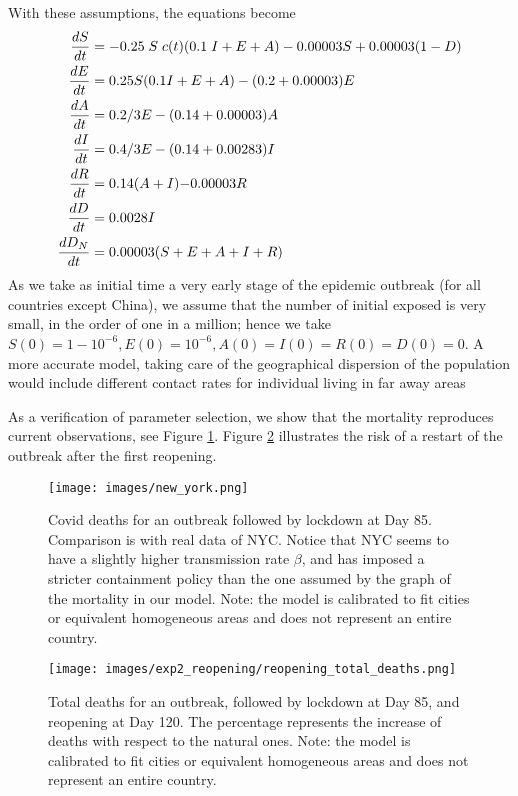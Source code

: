 \documentclass{amsart}
\begin{document}
With these assumptions, the equations become
\begin{align} 
\frac{dS}{dt} & =-0.25 \hskip 1mm S  \hskip 1mm
c(t)(0.1 \hskip 1mm I+E+A)-0.00003 S + 0.00003(1-D)\label{eq:dS1}\\
\frac{dE}{dt} & =0.25 S(0.1 I+E+A)-(0.2+0.00003)E\label{eq:dE1}\\
\frac{dA}{dt} & = 0.2/3 E -(0.14+
0.00003) A \label{eq:dA}\\
\frac{dI}{dt} & =0.4/3 E-(0.14+
0.00283)I\label{eq:dI1}\\
\frac{dR}{dt} & =0.14 (A+I){-0.00003 R}\label{eq:dR1}\\
\frac{dD}{dt} & =0.0028 I\label{eq:dD1}\\
\frac{dD_N}{dt} & = 0.00003(S+E+A+I+R)\label{eq:dDN1}
\end{align}
As we take as initial time a very early stage of the epidemic
outbreak (for all countries except China), we assume that the number of initial exposed is very small, in the order of
one in a million; hence we take $S(0)=1-10^{-6}, E(0)=10^{-6},  A(0)=I(0)=R(0)=D(0)=0$.
A more accurate model, taking care of the geographical dispersion
of the population would include different contact rates
for individual living in far away areas \cite{MarinoGattoetal}

As a verification of parameter selection, we show
that the mortality reproduces current observations,
see Figure \ref{total_deaths1}. 
Figure \ref{total_deaths2} illustrates the risk of a
restart of the outbreak after the first reopening.

\begin{figure}[h!]
    \centering
    \texttt{[image: images/new\_york.png]}
    \caption{ Covid deaths for an outbreak followed by lockdown at Day 85.
    Comparison is
    with real data of NYC. Notice that NYC seems to have 
    a slightly higher transmission rate $\beta$,
    and has imposed a stricter containment policy than
    the one assumed by the graph of the mortality 
    in our model. \footnotesize{Note: the model is calibrated to fit cities or equivalent homogeneous areas and does not represent an entire country.}}
    \label{total_deaths1}
\end{figure}





\begin{figure}[h!]
    \centering
    \texttt{[image: images/exp2\_reopening/reopening\_total\_deaths.png]}
    \caption{Total deaths for an outbreak, followed by lockdown at Day 85, and reopening at Day 120.
    The percentage represents the increase of deaths with respect to the natural ones. \footnotesize{Note: the model is calibrated to fit cities or equivalent homogeneous areas and does not represent an entire country.}}
    \label{total_deaths2}
\end{figure}
\end{document}

